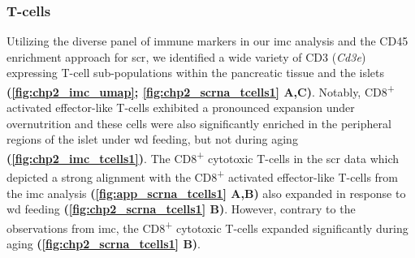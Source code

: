 \subsubsection{T-cells}
Utilizing the diverse panel of immune markers in our \gls{imc} analysis and the CD45 enrichment approach for \gls{scr}, we identified a wide variety of CD3 (\textit{Cd3e}) expressing T-cell sub-populations within the pancreatic tissue and the islets \textbf{(\autoref{fig:chp2_imc_umap}; \autoref{fig:chp2_scrna_tcells1} A,C)}. Notably, CD8\textsuperscript{+} activated effector-like T-cells exhibited a pronounced expansion under overnutrition and these cells were also significantly enriched in the peripheral regions of the islet under \gls{wd} feeding, but not during aging \textbf{(\autoref{fig:chp2_imc_tcells1})}. The CD8\textsuperscript{+} cytotoxic T-cells in the \gls{scr} data which depicted a strong alignment with the CD8\textsuperscript{+} activated effector-like T-cells from the \gls{imc} analysis \textbf{(\autoref{fig:app_scrna_tcells1} A,B)} also expanded in response to \gls{wd} feeding \textbf{(\autoref{fig:chp2_scrna_tcells1} B)}. However, contrary to the observations from \gls{imc}, the CD8\textsuperscript{+} cytotoxic T-cells expanded significantly during aging \textbf{(\autoref{fig:chp2_scrna_tcells1} B)}.

